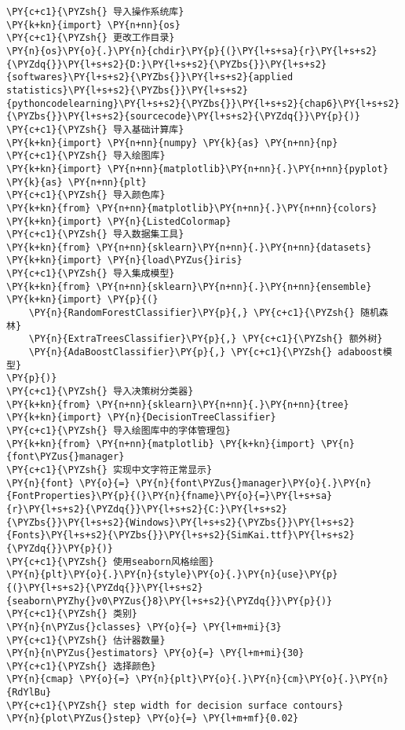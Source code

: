 \begin{Verbatim}[commandchars=\\\{\}]
\PY{c+c1}{\PYZsh{} 导入操作系统库}
\PY{k+kn}{import} \PY{n+nn}{os}
\PY{c+c1}{\PYZsh{} 更改工作目录}
\PY{n}{os}\PY{o}{.}\PY{n}{chdir}\PY{p}{(}\PY{l+s+sa}{r}\PY{l+s+s2}{\PYZdq{}}\PY{l+s+s2}{D:}\PY{l+s+s2}{\PYZbs{}}\PY{l+s+s2}{softwares}\PY{l+s+s2}{\PYZbs{}}\PY{l+s+s2}{applied statistics}\PY{l+s+s2}{\PYZbs{}}\PY{l+s+s2}{pythoncodelearning}\PY{l+s+s2}{\PYZbs{}}\PY{l+s+s2}{chap6}\PY{l+s+s2}{\PYZbs{}}\PY{l+s+s2}{sourcecode}\PY{l+s+s2}{\PYZdq{}}\PY{p}{)}
\PY{c+c1}{\PYZsh{} 导入基础计算库}
\PY{k+kn}{import} \PY{n+nn}{numpy} \PY{k}{as} \PY{n+nn}{np}
\PY{c+c1}{\PYZsh{} 导入绘图库}
\PY{k+kn}{import} \PY{n+nn}{matplotlib}\PY{n+nn}{.}\PY{n+nn}{pyplot} \PY{k}{as} \PY{n+nn}{plt}
\PY{c+c1}{\PYZsh{} 导入颜色库}
\PY{k+kn}{from} \PY{n+nn}{matplotlib}\PY{n+nn}{.}\PY{n+nn}{colors} \PY{k+kn}{import} \PY{n}{ListedColormap}
\PY{c+c1}{\PYZsh{} 导入数据集工具}
\PY{k+kn}{from} \PY{n+nn}{sklearn}\PY{n+nn}{.}\PY{n+nn}{datasets} \PY{k+kn}{import} \PY{n}{load\PYZus{}iris}
\PY{c+c1}{\PYZsh{} 导入集成模型}
\PY{k+kn}{from} \PY{n+nn}{sklearn}\PY{n+nn}{.}\PY{n+nn}{ensemble} \PY{k+kn}{import} \PY{p}{(}
    \PY{n}{RandomForestClassifier}\PY{p}{,} \PY{c+c1}{\PYZsh{} 随机森林}
    \PY{n}{ExtraTreesClassifier}\PY{p}{,} \PY{c+c1}{\PYZsh{} 额外树}
    \PY{n}{AdaBoostClassifier}\PY{p}{,} \PY{c+c1}{\PYZsh{} adaboost模型}
\PY{p}{)}
\PY{c+c1}{\PYZsh{} 导入决策树分类器}
\PY{k+kn}{from} \PY{n+nn}{sklearn}\PY{n+nn}{.}\PY{n+nn}{tree} \PY{k+kn}{import} \PY{n}{DecisionTreeClassifier}
\PY{c+c1}{\PYZsh{} 导入绘图库中的字体管理包}
\PY{k+kn}{from} \PY{n+nn}{matplotlib} \PY{k+kn}{import} \PY{n}{font\PYZus{}manager}
\PY{c+c1}{\PYZsh{} 实现中文字符正常显示}
\PY{n}{font} \PY{o}{=} \PY{n}{font\PYZus{}manager}\PY{o}{.}\PY{n}{FontProperties}\PY{p}{(}\PY{n}{fname}\PY{o}{=}\PY{l+s+sa}{r}\PY{l+s+s2}{\PYZdq{}}\PY{l+s+s2}{C:}\PY{l+s+s2}{\PYZbs{}}\PY{l+s+s2}{Windows}\PY{l+s+s2}{\PYZbs{}}\PY{l+s+s2}{Fonts}\PY{l+s+s2}{\PYZbs{}}\PY{l+s+s2}{SimKai.ttf}\PY{l+s+s2}{\PYZdq{}}\PY{p}{)}
\PY{c+c1}{\PYZsh{} 使用seaborn风格绘图}
\PY{n}{plt}\PY{o}{.}\PY{n}{style}\PY{o}{.}\PY{n}{use}\PY{p}{(}\PY{l+s+s2}{\PYZdq{}}\PY{l+s+s2}{seaborn\PYZhy{}v0\PYZus{}8}\PY{l+s+s2}{\PYZdq{}}\PY{p}{)}
\PY{c+c1}{\PYZsh{} 类别}
\PY{n}{n\PYZus{}classes} \PY{o}{=} \PY{l+m+mi}{3}
\PY{c+c1}{\PYZsh{} 估计器数量}
\PY{n}{n\PYZus{}estimators} \PY{o}{=} \PY{l+m+mi}{30}
\PY{c+c1}{\PYZsh{} 选择颜色}
\PY{n}{cmap} \PY{o}{=} \PY{n}{plt}\PY{o}{.}\PY{n}{cm}\PY{o}{.}\PY{n}{RdYlBu}
\PY{c+c1}{\PYZsh{} step width for decision surface contours}
\PY{n}{plot\PYZus{}step} \PY{o}{=} \PY{l+m+mf}{0.02}

\end{Verbatim}
